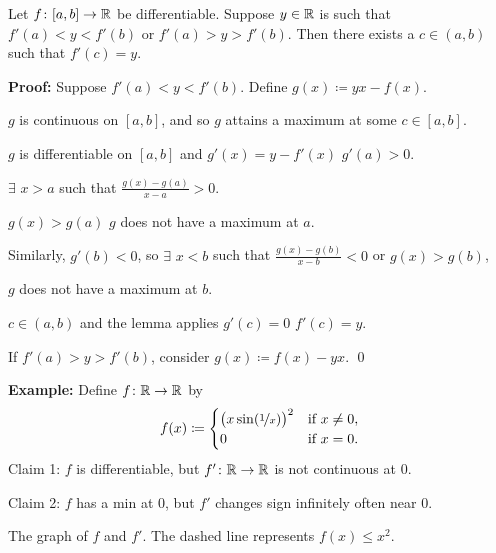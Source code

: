 \documentclass[10pt,aspectratio=169]{beamer}
\begin{document}
\begin{frame}

\begin{theorem}[Darboux]
Let $f \colon [a,b] \to {\mathbb{R}}$ be differentiable.  Suppose $y \in {\mathbb{R}}$ is such
that $f'(a) < y < f'(b)$ or
$f'(a) > y > f'(b)$.
Then there exists a $c \in (a,b)$ such that $f'(c) = y$.
\end{theorem}

\pause
\textbf{Proof:}
Suppose 
$f'(a) < y < f'(b)$.
\pause
Define
$g(x) \coloneqq yx - f(x)$.

\pause
$g$ is continuous on $[a,b]$, and so $g$ attains a maximum at some $c \in [a,b]$.

\pause
$g$ is differentiable on $[a,b]$ and $g'(x) = y-f'(x)$
\pause
\wthus $g'(a) > 0$.

\pause
\medskip
\thus \quad $\exists$ $x > a$ such that
$\displaystyle \frac{g(x)-g(a)}{x-a} > 0$.

\pause
\medskip

\thus \quad $g(x) > g(a)$
\pause
\wthus $g$ does not have a maximum at $a$.

\pause
\medskip

Similarly, $g'(b) < 0$, so $\exists$ $x < b$ such that
$\frac{g(x)-g(b)}{x-b} < 0$ or $g(x) > g(b)$,

\pause
\thus \quad $g$ does not have a maximum at $b$.

\pause
\medskip

\thus \quad $c \in (a,b)$ and the lemma applies  \wthus $g'(c)=0$
\pause
\wthus $f'(c) = y$.

\pause
\medskip

If $f'(a) > y > f'(b)$, consider $g(x) \coloneqq f(x)- yx$.
\qed

\end{frame}

\begin{frame}
\textbf{Example:}
Define $f \colon {\mathbb{R}} \to {\mathbb{R}}$ by
\begin{equation*}
f(x) \coloneqq
\begin{cases}
{\bigl( x \sin(\nicefrac{1}{x}) \bigr)}^2 & \text{if } x \not= 0, \\
0 & \text{if } x = 0.
\end{cases}
\end{equation*}
\pause
Claim 1: $f$ is differentiable, but $f' \colon {\mathbb{R}} \to {\mathbb{R}}$ is not continuous at
$0$.

\pause
\medskip

Claim 2: $f$ has a min at $0$, but $f'$
changes sign infinitely often near $0$.

\pause
\medskip


\medskip

The graph of $f$ and $f'$.  The dashed line represents $f(x) \leq x^2$.

\end{frame}
\end{document}
